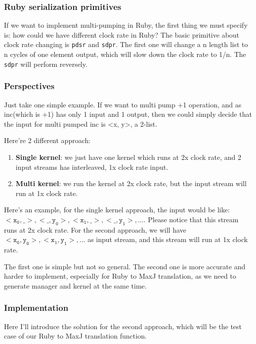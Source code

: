 \subsubsection{Ruby serialization primitives}

If we want to implement multi-pumping in Ruby, the first thing we must specify is: how could we have different clock rate in Ruby? The basic primitive about clock rate changing is \texttt{pdsr} and \texttt{sdpr}. The first one will change a n length list to n cycles of one element output, which will slow down the clock rate to 1/n. The \texttt{sdpr} will perform reversely.

\subsubsection{Perspectives}

Just take one simple example. If we want to multi pump +1 operation, and as inc(which is +1) has only 1 input and 1 output, then we could simply decide that the input for multi pumped inc is <x, y>, a 2-list. 

Here're 2 different approach:
\begin{enumerate}
\item \textbf{Single kernel}: we just have one kernel which runs at 2x clock rate, and 2 input streams has interleaved, 1x clock rate input.
\item \textbf{Multi kernel}: we run the kernel at 2x clock rate, but the input stream will run at 1x clock rate.
\end{enumerate}

Here's an example, for the single kernel approach, the input would be like: $\mathtt{<x_0,\_>, <\_,y_0>,<x_1,\_>,<\_,y_1>,...}$. Please notice that this stream runs at 2x clock rate. For the second approach, we will have $\mathtt{<x_0,y_0>,<x_1,y_1>,...}$ as input stream, and this stream will run at 1x clock rate.

The first one is simple but not so general. The second one is more accurate and harder to implement, especially for Ruby to MaxJ translation, as we need to generate manager and kernel at the same time.

\subsubsection{Implementation}

Here I'll introduce the solution for the second approach, which will be the test case of our Ruby to MaxJ translation function.

